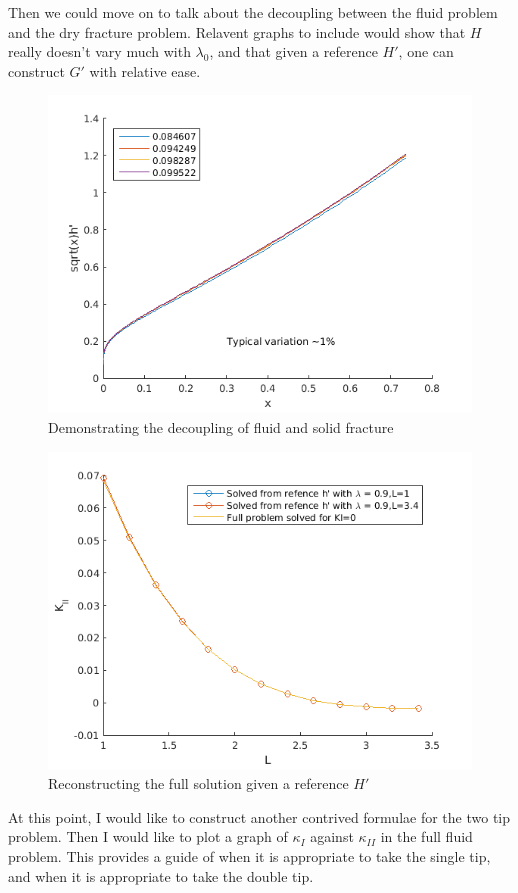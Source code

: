 \documentclass{jfm}
\begin{document}
Then we could move on to talk about the decoupling between the fluid problem
and the dry fracture problem. Relavent graphs to include would show that
$H$ really doesn't vary much with $\lambda_0$, and that given a reference
$H'$, one can construct $G'$ with relative ease.

\begin{figure}
 \centerline{
\includegraphics[scale=0.4]{./../../Graphs/hprime-variation.png}}
  \caption{Demonstrating the decoupling of fluid and solid fracture}
\end{figure}
%
\begin{figure}
 \centerline{
\includegraphics[scale=0.4]{./../../Graphs/fixed-fluid.png}}
  \caption{Reconstructing the full solution given a reference $H'$}
\end{figure}
At this point, I would like to construct another contrived formulae for the
two tip problem. Then I would like to plot a graph of $\kappa_I$ against
$\kappa_{II}$ in the full fluid problem. This provides a guide of when it
is appropriate to take the single tip, and when it is appropriate to take
the double tip. 
\end{document}

